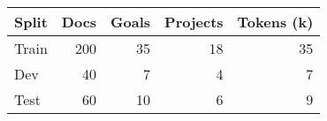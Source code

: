 \begin{tabular}{lrrrr}
\toprule
Split & Docs & Goals & Projects & Tokens (k) \\
\midrule
Train & 200 & 35 & 18 & 35 \\
Dev & 40 & 7 & 4 & 7 \\
Test & 60 & 10 & 6 & 9 \\
\bottomrule
\end{tabular}
